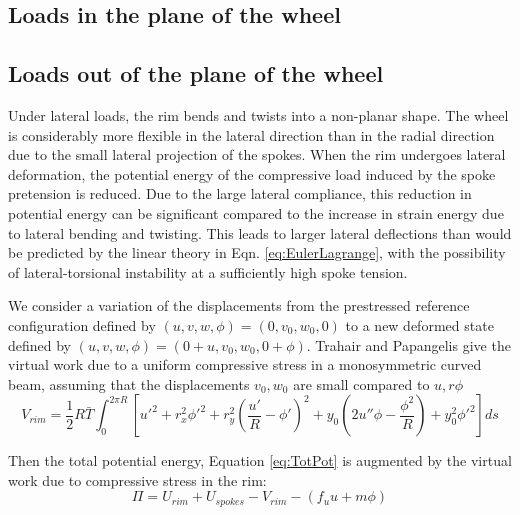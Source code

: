 \documentclass[\rootdir/thesis.tex]{subfiles}
\begin{document}
\subsection{Loads in the plane of the wheel}



\subsection{Loads out of the plane of the wheel}

Under lateral loads, the rim bends and twists into a non-planar shape. The wheel is considerably more flexible in the lateral direction than in the radial direction due to the small lateral projection of the spokes. When the rim undergoes lateral deformation, the potential energy of the compressive load induced by the spoke pretension is reduced. Due to the large lateral compliance, this reduction in potential energy can be significant compared to the increase in strain energy due to lateral bending and twisting. This leads to larger lateral deflections than would be predicted by the linear theory in Eqn. \eqref{eq:EulerLagrange}, with the possibility of lateral-torsional instability at a sufficiently high spoke tension.

We consider a variation of the displacements from the prestressed reference configuration defined by $(u,v,w,\phi)=(0,v_0,w_0,0)$ to a new deformed state defined by $(u,v,w,\phi)=(0+u,v_0,w_0,0+\phi)$. Trahair and Papangelis\cite{Trahair} give the virtual work due to a uniform compressive stress in a monosymmetric curved beam, assuming that the displacements $v_0,w_0$ are small compared to $u,r\phi$
\begin{equation}
\label{eq:V_rim}
V_{rim} = \frac{1}{2}R\bar{T} \int_0^{2\pi R}
    \left[u'^2 + r_x^2\phi'^2+r_y^2\left(\frac{u'}{R}-\phi'\right)^2
          +y_0\left(2u''\phi-\frac{\phi^2}{R}\right) + y_0^2\phi'^2 \right] ds
\end{equation}

Then the total potential energy, Equation \ref{eq:TotPot} is augmented by the virtual work due to compressive stress in the rim:
\begin{equation}
\label{eq:TotPot_V}
\Pi = U_{rim} + U_{spokes} - V_{rim} - (f_uu+m\phi)
\end{equation}
\end{document}
